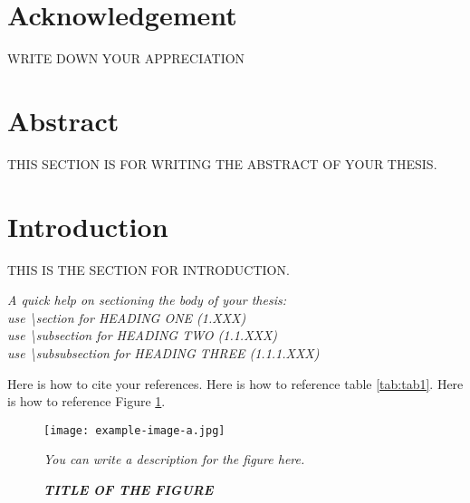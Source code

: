 \documentclass[a4paper, 12pt]{article}
\begin{document}

\clearpage
\phantom{}
\pagestyle{empty}
\clearpage

\section*{Acknowledgement}
\noindent WRITE DOWN YOUR APPRECIATION
\thispagestyle{empty} %
\clearpage

\section*{Abstract}
THIS SECTION IS FOR WRITING THE ABSTRACT OF YOUR THESIS.

\clearpage
\tableofcontents
\listoffigures
\listoftables
\clearpage

\pagestyle{fancy}

\section{Introduction}
THIS IS THE SECTION FOR INTRODUCTION.\cite{knuth1984texbook}

\textit{\noindent A quick help on sectioning the body of your thesis: \\
use \textbackslash section for HEADING ONE (1.XXX)\\
use \textbackslash subsection for HEADING TWO (1.1.XXX)\\
use \textbackslash subsubsection for HEADING THREE (1.1.1.XXX)}

Here is how to cite your references.\cite{lamport1986latex}
Here is how to reference table \ref{tab:tab1}.
Here is how to reference Figure \ref{fig:fig1}.

\begin{figure}[H]
  \centering
  \texttt{[image: example-image-a.jpg]}
  \caption{\small \textbf{\textit{TITLE OF THE FIGURE}}}
  \footnotesize \textit{You can write a description for the figure here.\cite{website2023example}}
  \label{fig:fig1}
\end{figure}
\end{document}
